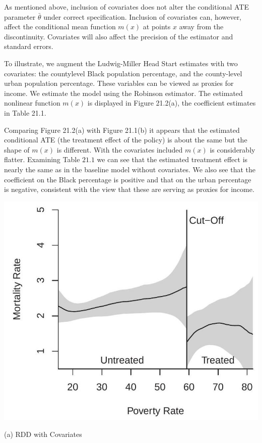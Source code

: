 \documentclass[10pt]{article}
\begin{document}
As mentioned above, inclusion of covariates does not alter the conditional ATE parameter $\bar{\theta}$ under correct specification. Inclusion of covariates can, however, affect the conditional mean function $m(x)$ at points $x$ away from the discontinuity. Covariates will also affect the precision of the estimator and standard errors.

To illustrate, we augment the Ludwig-Miller Head Start estimates with two covariates: the countylevel Black population percentage, and the county-level urban population percentage. These variables can be viewed as proxies for income. We estimate the model using the Robinson estimator. The estimated nonlinear function $m(x)$ is displayed in Figure 21.2(a), the coefficient estimates in Table 21.1.

Comparing Figure 21.2(a) with Figure 21.1(b) it appears that the estimated conditional ATE (the treatment effect of the policy) is about the same but the shape of $m(x)$ is different. With the covariates included $m(x)$ is considerably flatter. Examining Table $21.1$ we can see that the estimated treatment effect is nearly the same as in the baseline model without covariates. We also see that the coefficient on the Black percentage is positive and that on the urban percentage is negative, consistent with the view that these are serving as proxies for income.

\includegraphics[max width=\textwidth]{2022_10_23_bb8a8d8a5dc56cf142a9g-09}

(a) RDD with Covariates
\end{document}
